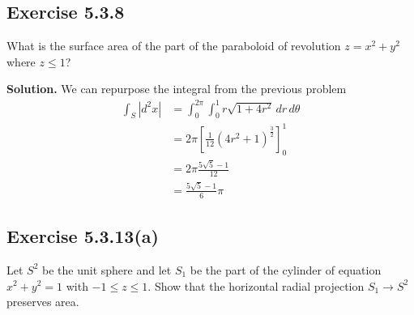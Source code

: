 \documentclass[12pt]{article}
\begin{document}
\newpage




\subsection*{Exercise 5.3.8}
What is the surface area of the part of the paraboloid of revolution  $z = x^2 + y^2$ where $z\leq 1$?

\medskip

\textbf{Solution.}
We can repurpose the integral from the previous problem 
\begin{align*}
  \int_S|d^2x|
  &= \int_0^{2\pi} \int_0^{1} r\sqrt{1 + 4r^2} \,dr \,d\theta \\
  &= 2\pi \left[ \frac{1}{12} (4r^2+1)^{\frac{3}{2}}\right]_0^1 \\
  &= 2\pi \frac{5\sqrt{5}-1}{12} \\
  &= \frac{5\sqrt{5}-1}{6} \pi
\end{align*}
\newpage






\subsection*{Exercise 5.3.13(a)}
Let $S^2$ be the unit sphere and let $S_1$ be the part of the cylinder of equation $x^2+y^2 = 1$ with $-1\leq z\leq 1$. Show that the horizontal radial projection $S_1\rightarrow S^2$ preserves area.

\medskip
\end{document}

